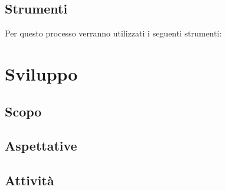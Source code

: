 \subsection{Strumenti}
Per questo processo verranno utilizzati i seguenti strumenti:

\section{Sviluppo}

\subsection{Scopo}

\subsection{Aspettative}

\subsection{Attività}